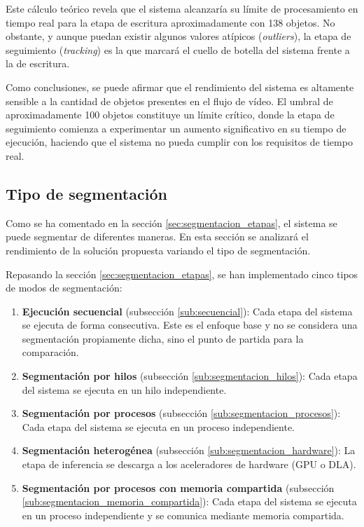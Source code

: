 \documentclass[11pt,spanish,listoffigures,listoftables]{tfgetsinf}
\begin{document}
Este cálculo teórico revela que el sistema alcanzaría su límite de procesamiento en tiempo real para la etapa de escritura aproximadamente con 138 objetos. No obstante, y aunque puedan existir algunos valores atípicos (\textit{outliers}), la etapa de seguimiento (\textit{tracking}) es la que marcará el cuello de botella del sistema frente a la de escritura.

Como conclusiones, se puede afirmar que el rendimiento del sistema es altamente sensible a la cantidad de objetos presentes en el flujo de vídeo. El umbral de aproximadamente 100 objetos constituye un límite crítico, donde la etapa de seguimiento comienza a experimentar un aumento significativo en su tiempo de ejecución, haciendo que el sistema no pueda cumplir con los requisitos de tiempo real.

\subsection{Tipo de segmentación} \label{sub:analisis_segmentacion}
Como se ha comentado en la sección \ref{sec:segmentacion_etapas}, el sistema se puede segmentar de diferentes maneras. En esta sección se analizará el rendimiento de la solución propuesta variando el tipo de segmentación.

Repasando la sección \ref{sec:segmentacion_etapas}, se han implementado cinco tipos de modos de segmentación:
\begin{enumerate}
   \item \textbf{Ejecución secuencial} (subsección \ref{sub:secuencial}): Cada etapa del sistema se ejecuta de forma consecutiva. Este es el enfoque base y no se considera una segmentación propiamente dicha, sino el punto de partida para la comparación.
   \item \textbf{Segmentación por hilos} (subsección \ref{sub:segmentacion_hilos}): Cada etapa del sistema se ejecuta en un hilo independiente.
   \item \textbf{Segmentación por procesos} (subsección \ref{sub:segmentacion_procesos}): Cada etapa del sistema se ejecuta en un proceso independiente.
   \item \textbf{Segmentación heterogénea} (subsección \ref{sub:segmentacion_hardware}): La etapa de inferencia se descarga a los aceleradores de hardware (GPU o DLA).
   \item \textbf{Segmentación por procesos con memoria compartida} (subsección \ref{sub:segmentacion_memoria_compartida}): Cada etapa del sistema se ejecuta en un proceso independiente y se comunica mediante memoria compartida.
\end{enumerate}
\end{document}
